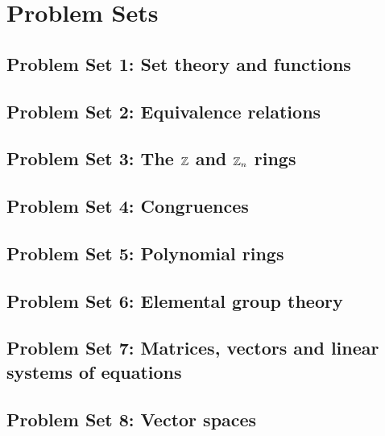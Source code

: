 \documentclass{lecturenotes}
\date{20/21 S1}
\begin{document}
    \pagestyle{plain}
    \lntitlepage
    \clearpage
    \tableofcontents
    \newpage

    
    
    
    
    

    \appendix
    \chapter{Problem Sets}
        \section{Problem Set 1: Set theory and functions}
        \section{Problem Set 2: Equivalence relations}
        \section{Problem Set 3: The $\mathbb{Z}$ and $\mathbb{Z}_n$ rings}
        \section{Problem Set 4: Congruences}
        \section{Problem Set 5: Polynomial rings}
        \section{Problem Set 6: Elemental group theory}
        \section{Problem Set 7: Matrices, vectors and linear systems of equations}
        \section{Problem Set 8: Vector spaces}

    \clearpage
    \listoftheorems
    \clearpage
    \listofdefinitions

    \nocite{*}

    
\end{document}
